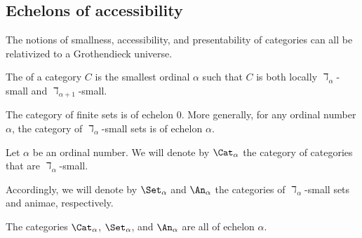 \subsection{Echelons of accessibility}%
\label{sub:echelons_of_accessibility}

The notions of smallness,
accessibility, and presentability of categories
can all be relativized to a Grothendieck universe.

\begin{definition}
	The  of a category $ C $ is
	the smallest ordinal $ \alpha $ such that
	$ C $ is both
	locally $ \daleth_{\alpha} $-small
	and $ \daleth_{\alpha + 1} $-small.
\end{definition}

\begin{eg}
	The category of finite sets is 
	of echelon $ 0 $.
	More generally, for any ordinal number $ \alpha $,
	the category of $ \daleth_{\alpha} $-small sets is
	of echelon $ \alpha $.
\end{eg}

\begin{notation}
	Let $ \alpha $ be an ordinal number.
	We will denote by $ \Cat_{\alpha} $
	the category of categories that are
	$ \daleth_{\alpha} $-small.

	Accordingly, we will denote by
	$ \Set_{\alpha} $ and $ \An_{\alpha} $
	the categories of $ \daleth_{\alpha} $-small
	sets and animae, respectively.

	The categories $ \Cat_{\alpha} $, $ \Set_{\alpha} $, and $ \An_{\alpha} $
	are all of echelon $ \alpha $.
\end{notation}

